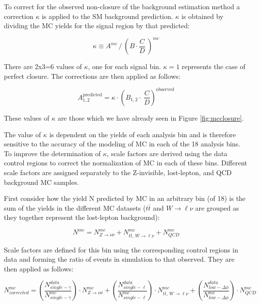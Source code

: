 To correct for the observed non-closure of the background estimation method a correction $\kappa$ is applied to the SM background prediction. $\kappa$ is obtained by dividing the MC yields for the signal region by that predicted:

\begin{equation}
\kappa  \equiv A^{mc} \,/  \ \left(B \cdot \frac{C} {D} \ \right)^{mc}
\label{eq:kappa}
\end{equation}

There are 2x3=6 values of $\kappa$, one for each signal bin. $\kappa=1$ represents the case of perfect closure. The corrections are then applied as follows:

\begin{equation}
A_{1, 2}^{\mathrm{predicted}} = \kappa \cdot \left(B_{1, 2} \cdot \ \frac{C}{D}\right)^{\textrm{observed}}
\end{equation}

These values of $\kappa$ are those which we have already seen in Figure \ref{fig:mcclosure}.

The value of $\kappa$ is dependent on the yields of each analysis bin and is therefore sensitive to the accuracy of the modeling of MC in each of the 18 analysis bins. To improve the determination of $\kappa$, scale factors are derived using the data control regions to correct the normalization of MC in each of these bins. Different scale factors are assigned separately to the Z-invisible, lost-lepton, and QCD background MC samples.

First consider how the yield N predicted by MC in an arbitrary bin (of 18) is the sum of the yields in the different MC datasets ($t\bar{t}$ and $W\rightarrow\ell\nu$ are grouped as they together represent the lost-lepton background):

\begin{equation}
N^{mc} = N_{Z\rightarrow\nu\bar{\nu}}^{mc} + N_{t\bar{t},\,W\rightarrow\ell\nu}^{mc} + N_{QCD}^{mc}
\end{equation}

Scale factors are defined for this bin using the corresponding control regions in data and forming the ratio of events in simulation to that observed. They are then applied as follows:

\begin{equation}
N_{corrected}^{mc} = \left(\frac{N_{single-\gamma}^{data}}{N_{single-\gamma}^{mc}}\right) \cdot N_{Z\rightarrow\nu\bar{\nu}}^{mc} + \left(\frac{N^{data}_{single-\ell}}{N^{mc}_{single-\ell}}\right) \cdot N^{mc}_{t\bar{t},\,W\rightarrow\ell\nu} + \left(\frac{N^{data}_{low-\Delta\phi}}{N^{mc}_{low-\Delta\phi}}\right) \cdot N_{QCD}^{mc}
\end{equation}

